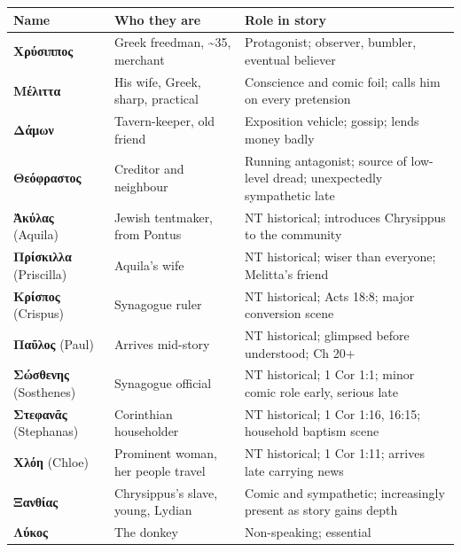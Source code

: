 \documentclass[a4paper]{report}
\begin{document}
{\def\LTcaptype{none} %
\begin{longtable}[]{@{}
  >{\raggedright\arraybackslash}p{}
  >{\raggedright\arraybackslash}p{}
  >{\raggedright\arraybackslash}p{}@{}}
\toprule\noalign{}
\begin{minipage}[b]{\linewidth}\raggedright
Name
\end{minipage} & \begin{minipage}[b]{\linewidth}\raggedright
Who they are
\end{minipage} & \begin{minipage}[b]{\linewidth}\raggedright
Role in story
\end{minipage} \\
\midrule\noalign{}
\endhead
\bottomrule\noalign{}
\endlastfoot
\textbf{Χρύσιππος} & Greek freedman, \textasciitilde35, merchant &
Protagonist; observer, bumbler, eventual believer \\
\textbf{Μέλιττα} & His wife, Greek, sharp, practical & Conscience and
comic foil; calls him on every pretension \\
\textbf{Δάμων} & Tavern-keeper, old friend & Exposition vehicle; gossip;
lends money badly \\
\textbf{Θεόφραστος} & Creditor and neighbour & Running antagonist;
source of low-level dread; unexpectedly sympathetic late \\
\textbf{Ἀκύλας} (Aquila) & Jewish tentmaker, from Pontus & NT
historical; introduces Chrysippus to the community \\
\textbf{Πρίσκιλλα} (Priscilla) & Aquila's wife & NT historical; wiser
than everyone; Melitta's friend \\
\textbf{Κρίσπος} (Crispus) & Synagogue ruler & NT historical; Acts 18:8;
major conversion scene \\
\textbf{Παῦλος} (Paul) & Arrives mid-story & NT historical; glimpsed
before understood; Ch 20+ \\
\textbf{Σώσθενης} (Sosthenes) & Synagogue official & NT historical; 1
Cor 1:1; minor comic role early, serious late \\
\textbf{Στεφανᾶς} (Stephanas) & Corinthian householder & NT historical;
1 Cor 1:16, 16:15; household baptism scene \\
\textbf{Χλόη} (Chloe) & Prominent woman, her people travel & NT
historical; 1 Cor 1:11; arrives late carrying news \\
\textbf{Ξανθίας} & Chrysippus's slave, young, Lydian & Comic and
sympathetic; increasingly present as story gains depth \\
\textbf{Λύκος} & The donkey & Non-speaking; essential \\
\end{longtable}
}
\end{document}
